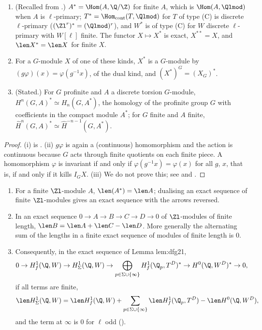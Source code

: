 \begin{proposition}\label{prop:cohomology:pontryagin}
\begin{enumerate}[label=(\roman*)]
\item (Recalled from .) $A^*=\Hom(A,\Q/\Z)$ for finite $A$, which is $\Hom(A,\Qlmod)$ when $A$ is $\ell$-primary; $T^*=\Hom_{\mathrm{cont}}(T,\Qlmod)$ for $T$ of
type (C) is discrete $\ell$-primary ($(\Zl^r)^*=(\Qlmod)^r$), and $W^*$ is of type (C) for $W$ discrete $\ell$-primary with $W[\ell]$ finite. The functor $X\mapsto X^*$ is exact,
$X^{**}=X$, and $\len X^*=\len X$ for finite $X$.
\item For a $G$-module $X$ of one of these kinds, $X^*$ is a $G$-module by $(g\varphi)(x)=\varphi(g^{-1}x)$, of the dual kind, and $(X^*)^G=(X_G)^*$.
\item (Stated.) For $G$ profinite and $A$ a discrete torsion $G$-module, $H^n(G,A)^*\simeq H_n(G,A^*)$, the homology of the profinite group $G$ with coefficients in the compact
module $A^*$; for $G$ finite and $A$ finite, $\hat H^n(G,A)^*\simeq\hat H^{-n-1}(G,A^*)$.
\end{enumerate}
\end{proposition}

\begin{proof}
(i) is . (ii) $g\varphi$ is again a (continuous) homomorphism and the action is continuous because $G$ acts through finite quotients on each
finite piece. A homomorphism $\varphi$ is invariant if and only if $\varphi(g^{-1}x)=\varphi(x)$ for all $g$, $x$, that is, if and only if it kills $I_GX$. (iii) We do not prove
this; see \cite[Chapter I, Section 3 and Chapter II, Section 7]{NSW} and \cite[Chapter VI, Section 7]{Brown}.
\end{proof}

\begin{lemma}\label{lem:cohomology:lengths}
\begin{enumerate}[label=(\roman*)]
\item \sloppy For a finite $\Zl$-module $A$, $\len(A^*)=\len A$; dualising an exact sequence of finite $\Zl$-modules gives an exact sequence with the arrows reversed.
\item In an exact sequence $0\to A\to B\to C\to D\to0$ of $\Zl$-modules of finite length, $\len B=\len A+\len C-\len D$. More generally the alternating sum of the lengths in
a finite exact sequence of modules of finite length is $0$.
\item Consequently, in the exact sequence of Lemma lem:dfg21,
\[
0\to H^1_f(\Q,W)\to H^1_\Sigma(\Q,W)\to\bigoplus_{p\in\Sigma\cup\{\infty\}}H^1_f(\Q_p,T^D)^*\to H^0(\Q,W^D)^*\to0,
\]
if all terms are finite,
\[
\len H^1_\Sigma(\Q,W)=\len H^1_f(\Q,W)+\sum_{p\in\Sigma\cup\{\infty\}}\len H^1_f(\Q_p,T^D)-\len H^0(\Q,W^D),
\]
and the term at $\infty$ is $0$ for $\ell$ odd ().
\end{enumerate}
\end{lemma}

